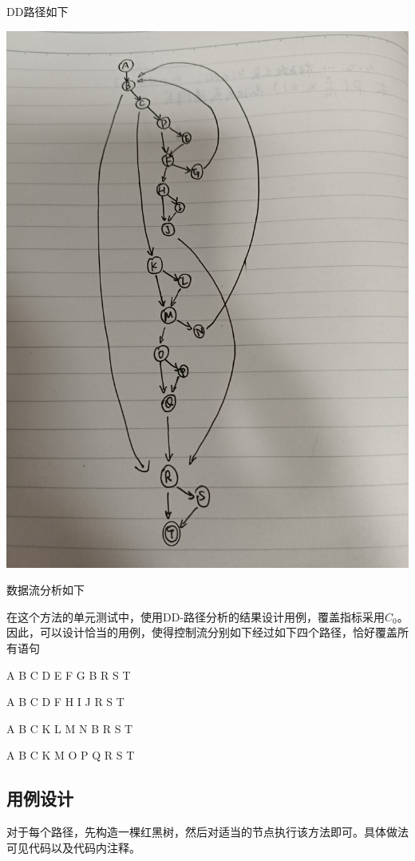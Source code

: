 \documentclass[12pt, a4paper, oneside]{ctexart}
\begin{document}
DD路径如下

\includegraphics[scale=0.06]{screenshots/DD-removeFixUp.jpg}

数据流分析如下

在这个方法的单元测试中，使用DD-路径分析的结果设计用例，覆盖指标采用$C_0$。
因此，可以设计恰当的用例，使得控制流分别如下经过如下四个路径，恰好覆盖所有语句

A B C D E F G B R S T

A B C D F H I J R S T

A B C K L M N B R S T

A B C K M O P Q R S T

\subsection{用例设计}

对于每个路径，先构造一棵红黑树，然后对适当的节点执行该方法即可。具体做法可见代码以及代码内注释。
\end{document}
